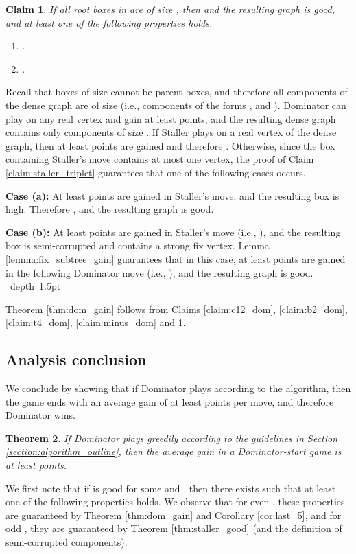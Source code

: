 \documentclass[11pt]{article}
\def\Proof{\par\noindent{\bf Proof:~}}
\def\blackslug{\hbox{\hskip 1pt \vrule width 4pt height 8pt
    depth 1.5pt \hskip 1pt}}
\def\QED{\quad\blackslug\lower 8.5pt\null\par}
\def\dnsitem{\vspace{-7pt}\item}
\newtheorem{theorem}{Theorem}[section]
\newtheorem{claim}[theorem]{Claim}
\theoremstyle{definition}
\begin{document}
\begin{claim}
\label{claim:t1_dom}
If all root boxes in  are of size , then  and the resulting graph  is good, and at least one of the following properties holds.
\begin{enumerate}
	\dnsitem .
	\dnsitem .
\end{enumerate}
\end{claim}
\Proof
Recall that boxes of size  cannot be parent boxes, and therefore all components of the dense graph are of size  (i.e., components of the forms ,  and ).
Dominator can play on any real vertex and gain at least  points, and the resulting dense graph  contains only components of size .
If Staller plays on a real vertex of the dense graph, then at least  points are gained and therefore .
Otherwise, since the box containing Staller's move contains at most one  vertex, the proof of Claim \ref{claim:staller_triplet} guarantees that one of the following cases occurs.
\smallskip
\par\noindent
{\bf Case (a):}
At least  points are gained in Staller's move, and the resulting box is high.
Therefore , and the resulting graph  is good.
\smallskip
\par\noindent
{\bf Case (b):}
At least  points are gained in Staller's move (i.e., ), and the resulting box is semi-corrupted and contains a strong fix vertex. 
Lemma \ref{lemma:fix_subtree_gain} guarantees that in this case, at least  points are gained in the following Dominator move (i.e., ), and the resulting graph  is good.
\QED

Theorem \ref{thm:dom_gain} follows from Claims 
\ref{claim:c12_dom}, \ref{claim:b2_dom}, \ref{claim:t4_dom}, \ref{claim:minus_dom} and \ref{claim:t1_dom}.



\subsection{Analysis conclusion}
\label{sub:an_conclusion}

We conclude by showing that if Dominator plays according to the algorithm, then the game ends with an average gain of at least  points per move, and therefore Dominator wins.

\begin{theorem}
\label{cor:dom_wins}
If Dominator plays greedily according to the guidelines in Section \ref{section:algorithm_outline}, then the average gain in a Dominator-start game is at least  points.
\end{theorem}
\Proof
We first note that if  is good for some  and , then there exists  such that at least one of the following properties holds.
We observe that for even , these properties are guaranteed by Theorem \ref{thm:dom_gain} and Corollary \ref{cor:last_5},
and for odd , they are guaranteed by Theorem \ref{thm:staller_good} (and the definition of semi-corrupted components).
\end{document}
